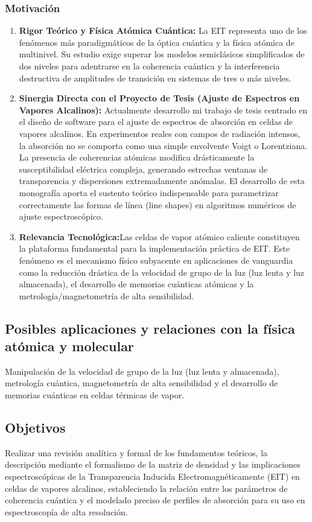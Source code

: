 \subsubsection{Motivación}
\begin{enumerate}
    \item \textbf{Rigor Teórico y Física Atómica Cuántica:} La EIT representa uno de los fenómenos más paradigmáticos de la óptica cuántica y la física atómica de multinivel. Su estudio exige superar los modelos semiclásicos simplificados de dos niveles para adentrarse en la coherencia cuántica y la interferencia destructiva de amplitudes de transición en sistemas de tres o más niveles.
    \item \textbf{Sinergia Directa con el Proyecto de Tesis (Ajuste de Espectros en Vapores Alcalinos):} Actualmente desarrollo mi trabajo de tesis centrado en el diseño de software para el ajuste de espectros de absorción en celdas de vapores alcalinos. En experimentos reales con campos de radiación intensos, la absorción no se comporta como una simple envolvente Voigt o Lorentziana. La presencia de coherencias atómicas modifica drásticamente la susceptibilidad eléctrica compleja, generando estrechas ventanas de transparencia y dispersiones extremadamente anómalas. El desarrollo de esta monografía aporta el sustento teórico indispensable para parametrizar correctamente las formas de línea (line shapes) en algoritmos numéricos de ajuste espectroscópico.
    \item \textbf{Relevancia Tecnológica:}Las celdas de vapor atómico caliente constituyen la plataforma fundamental para la implementación práctica de EIT. Este fenómeno es el mecanismo físico subyacente en aplicaciones de vanguardia como la reducción drástica de la velocidad de grupo de la luz (luz lenta y luz almacenada), el desarrollo de memorias cuánticas atómicas y la metrología/magnetometría de alta sensibilidad.
\end{enumerate}
\subsection{Posibles aplicaciones y relaciones con la física atómica y molecular}
Manipulación de la velocidad de grupo de la luz (luz lenta y almacenada), metrología cuántica, magnetometría de alta sensibilidad y el desarrollo de memorias cuánticas en celdas térmicas de vapor.
\subsection{Objetivos}
Realizar una revisión analítica y formal de los fundamentos teóricos, la descripción mediante el formalismo de la matriz de densidad y las implicaciones espectroscópicas de la Transparencia Inducida Electromagnéticamente (EIT) en celdas de vapores alcalinos, estableciendo la relación entre los parámetros de coherencia cuántica y el modelado preciso de perfiles de absorción para su uso en espectroscopía de alta resolución.

